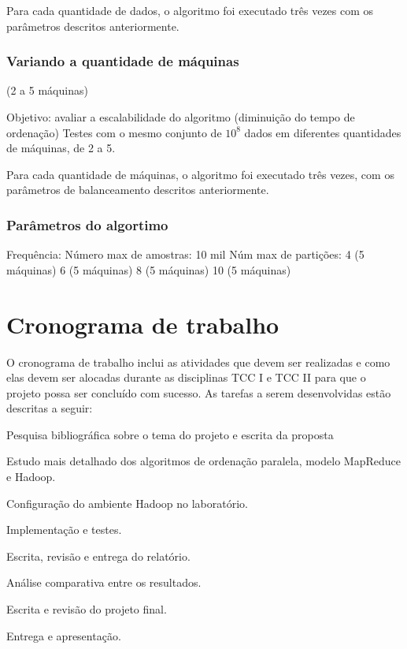  Para cada quantidade de dados, o algoritmo foi executado três vezes com os parâmetros descritos anteriormente. 
 
\subsubsection{Variando a quantidade de máquinas}
 (2 a 5 máquinas)
 
 Objetivo: avaliar a escalabilidade do algoritmo (diminuição do tempo de ordenação) 
 Testes com o mesmo conjunto de $10^{8}$ dados em diferentes quantidades de máquinas, de 2 a 5. 
 
 Para cada quantidade de máquinas, o algoritmo foi executado três vezes, com os parâmetros de balanceamento descritos anteriormente.
 
\subsubsection{Parâmetros do algortimo}

Frequência:
Número max de amostras: 10 mil
Núm max de partições: 	4 (5 máquinas)
			6 (5 máquinas)
			8 (5 máquinas)
			10 (5 máquinas)



\section{Cronograma de trabalho}


O cronograma de trabalho inclui as atividades que devem ser realizadas e como elas devem ser alocadas durante as disciplinas TCC I e TCC II para que o projeto possa ser concluído com sucesso.
As tarefas a serem desenvolvidas estão descritas a seguir:

\begin{num_enum}
 \item \label{c1} Pesquisa bibliográfica sobre o tema do projeto e escrita da proposta
 \item \label{c2} Estudo mais detalhado dos algoritmos de ordenação paralela,  modelo MapReduce e Hadoop.
 \item \label{c3} Configuração do ambiente Hadoop no laboratório.
 \item \label{c4} Implementação e testes.
 \item \label{c5} Escrita, revisão e entrega do relatório. 
 \item \label{c7} Análise comparativa entre os resultados.
 \item \label{c8} Escrita e revisão do projeto final.
 \item \label{c9} Entrega e apresentação.
 \end{num_enum}
 
